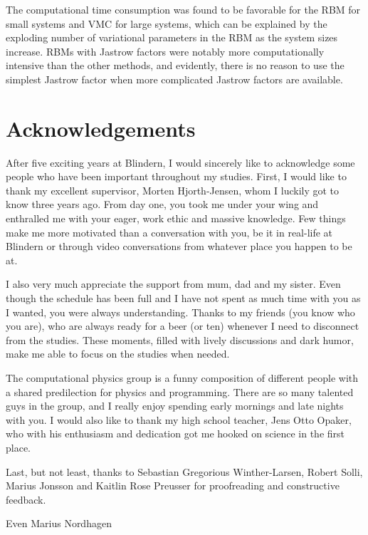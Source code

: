The computational time consumption was found to be favorable for the RBM for small systems and VMC for large systems, which can be explained by the exploding number of variational parameters in the RBM as the system sizes increase. RBMs with Jastrow factors were notably more computationally intensive than the other methods, and evidently, there is no reason to use the simplest Jastrow factor when more complicated Jastrow factors are available.

\thispagestyle{empty}
\cleardoublepage

\section*{Acknowledgements}
After five exciting years at Blindern, I would sincerely like to acknowledge some people who have been important throughout my studies. First, I would like to thank my excellent supervisor, Morten Hjorth-Jensen, whom I luckily got to know three years ago. From day one, you took me under your wing and enthralled me with your eager, work ethic and massive knowledge. Few things make me more motivated than a conversation with you, be it in real-life at Blindern or through video conversations from whatever place you happen to be at.

I also very much appreciate the support from mum, dad and my sister. Even though the schedule has been full and I have not spent as much time with you as I wanted, you were always understanding. Thanks to my friends (you know who you are), who are always ready for a beer (or ten) whenever I need to disconnect from the studies. These moments, filled with lively discussions and dark humor, make me able to focus on the studies when needed.

The computational physics group is a funny composition of different people with a shared predilection for physics and programming. There are so many talented guys in the group, and I really enjoy spending early mornings and late nights with you. I would also like to thank my high school teacher, Jens Otto Opaker, who with his enthusiasm and dedication got me hooked on science in the first place.

Last, but not least, thanks to Sebastian Gregorious Winther-Larsen, Robert Solli, Marius Jonsson and Kaitlin Rose Preusser for proofreading and constructive feedback.\vspace{5cm}


Even Marius Nordhagen

    
\thispagestyle{empty}
\cleardoublepage

\newpage

{%
    \tableofcontents
    \thispagestyle{empty}
    \clearpage}%

\thispagestyle{empty}
\clearpage


